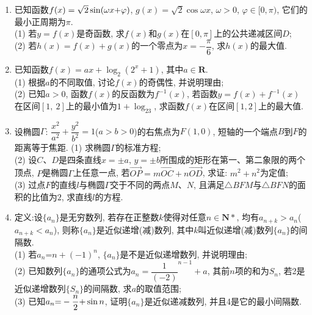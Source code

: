\documentclass[10pt,a4paper]{article}
\begin{document}
\begin{enumerate}[1.]
(1) 若三棱柱$ABC-A_1B_1C_1$的体积为$3\sqrt 3$, 求三棱柱$ABC-A_1B_1C_1$的高;\\
(2) 若$C_1C=2$, 求二面角$D-B_1C_1-A_1$的大小.
\item 已知函数$f(x)=\sqrt 2\sin (\omega x\text+\varphi)$, $g(x)=\sqrt 2\cos \omega x$, $\omega >0$, $\varphi \in [ 0,\pi)$, 它们的最小正周期为$\pi$.\\
(1) 若$y=f(x)$是奇函数, 求$f(x)$和$g(x)$在$[0,\pi ]$上的公共递减区间$D$;\\
(2) 若$h(x)=f(x)+g(x)$的一个零点为$x=-\dfrac{\pi }6$, 求$h(x)$的最大值.
\item 已知函数$f(x)=ax+\log_2(2^x+1)$, 其中$a\in \mathbf{R}$.\\
(1) 根据$a$的不同取值, 讨论$f(x)$的奇偶性, 并说明理由;\\
(2) 已知$a>0$, 函数$f(x)$的反函数为${f^{-1}}(x)$, 若函数$y=f(x)+{f^{-1}}(x)$在区间$[1,\ 2]$上的最小值为$1+\log_23$, 求函数$f(x)$在区间$[1,2]$上的最大值.
\item 设椭圆$\Gamma$: $\dfrac{x^2}{a^2}+\dfrac{y^2}{b^2}=1$($a>b>0$)的右焦点为$F(1, 0)$, 短轴的一个端点$B$到$F$的距离等于焦距.
(1) 求椭圆$\Gamma$的标准方程;\\
(2) 设$C$、$D$是四条直线$x=\pm a$, $y=\pm b$所围成的矩形在第一、第二象限的两个顶点, $P$是椭圆$\Gamma$上任意一点, 若$\overrightarrow{OP}=m\overrightarrow{OC}+n\overrightarrow{OD}$, 求证: $m^2+n^2$为定值;\\
(3) 过点$F$的直线$l$与椭圆$\Gamma$交于不同的两点$M$、$N$, 且满足$\triangle BFM$与$\triangle BFN$的面积的比值为$2$, 求直线$l$的方程.
\item 定义:设$\{a_n\}$是无穷数列, 若存在正整数$k$使得对任意$n\in \mathbf{N}*$, 均有${a_{n+k}}>{a_n}$(${a_{n+k}}<{a_n}$), 则称$\{a_n\}$是近似递增(减)数列, 其中$k$叫近似递增(减)数列$\{a_n\}$的间隔数.\\
(1) 若$a_n\text{=}n+(-1)^n$, $\{ {a_n} \}$是不是近似递增数列, 并说明理由;\\
(2) 已知数列$\{ {a_n} \}$的通项公式为$a_n=\dfrac 1{(-2)}^{n-1}+a$, 其前$n$项的和为$S_n$, 若2是近似递增数列$\{ {S_n} \}$的间隔数, 求$a$的取值范围;\\
(3) 已知$a_n\text{=}-\dfrac n{\text2}\text+\sin n$, 证明$\{ {a_n} \}$是近似递减数列, 并且4是它的最小间隔数.


\end{enumerate}
\end{document}
